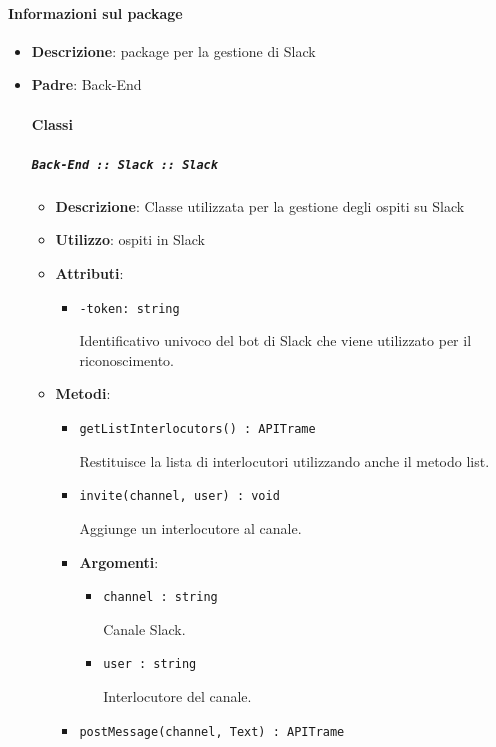 \documentclass[../DefinizioneDiProdotto.tex]{subfiles}
\begin{document}
	\paragraph{Informazioni sul package}\begin{itemize}\item \textbf{Descrizione}: package per la gestione di Slack\item \textbf{Padre}: Back-End\paragraph{Classi}
	\subparagraph{\texttt{Back-End :: Slack :: Slack}}
	\begin{itemize}\item \textbf{Descrizione}: Classe utilizzata per la gestione degli ospiti su Slack
	\item \textbf{Utilizzo}: ospiti in Slack
	\item \textbf{Attributi}:
	\begin{itemize}
	\item \texttt{-token: string}\

	 Identificativo univoco del bot di Slack che viene utilizzato per il riconoscimento.
	\end{itemize}
	\item \textbf{Metodi}:
	\begin{itemize}
	\item \texttt{getListInterlocutors() : APITrame}\

	 Restituisce la lista di interlocutori utilizzando anche il metodo list.
	\end{itemize}\vspace{0.5em}
	\begin{itemize}
	\item \texttt{invite(channel, user) : void}\

	 Aggiunge un interlocutore al canale.

	\item \textbf{Argomenti}:
	\begin{itemize}
	\item \texttt{channel : string}\

	 Canale Slack.
	\item \texttt{user : string}\

	 Interlocutore del canale.
	\end{itemize}
	\end{itemize}\vspace{0.5em}
	\begin{itemize}
	\item \texttt{postMessage(channel, Text) : APITrame}\


\end{itemize}
\end{itemize}
\end{itemize}
\end{document}
